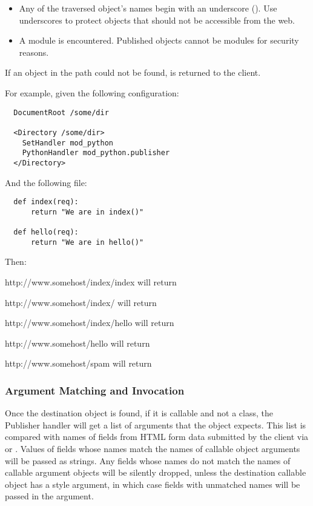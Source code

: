 \begin{itemize}

\item
  Any of the traversed object's names begin with an underscore
  (\samp{\_}). Use underscores to protect objects that should not be
  accessible from the web.

\item
  A module is encountered. Published objects cannot be modules for
  security reasons.

\end{itemize}

If an object in the path could not be found, 
is returned to the client.

For example, given the following configuration:

\begin{verbatim}
  DocumentRoot /some/dir

  <Directory /some/dir>
    SetHandler mod_python
    PythonHandler mod_python.publisher
  </Directory>
\end{verbatim}

And the following  file:

\begin{verbatim}
  def index(req):
      return "We are in index()"

  def hello(req):
      return "We are in hello()"

\end{verbatim}

Then:

http://www.somehost/index/index will return 

http://www.somehost/index/ will return 

http://www.somehost/index/hello will return 

http://www.somehost/hello will return 

http://www.somehost/spam will return 

\subsubsection{Argument Matching and Invocation\label{hand-pub-alg-args}}

Once the destination object is found, if it is callable and not a
class, the Publisher handler will get a list of arguments that the
object expects. This list is compared with names of fields from HTML
form data submitted by the client via  or
. Values of fields whose names match the names of callable
object arguments will be passed as strings. Any fields whose names do
not match the names of callable argument objects will be silently dropped,
unless the destination callable object has a  style
argument, in which case fields with unmatched names will be passed in the
 argument.

